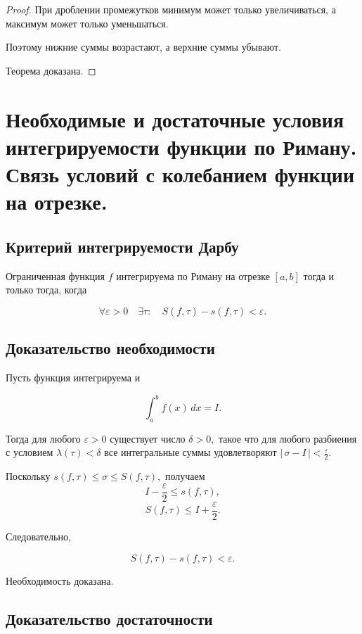 \documentclass[14pt]{extreport}
\begin{document}
\begin{proof}

При дроблении промежутков минимум может только увеличиваться,
а максимум может только уменьшаться.

Поэтому нижние суммы возрастают,
а верхние суммы убывают.

Теорема доказана.
\end{proof}

    \chapter{Необходимые и достаточные условия интегрируемости функции по Риману. Связь условий с колебанием функции на отрезке.}
    \section{Критерий интегрируемости Дарбу}

\begin{theorem}
Ограниченная функция $f$ интегрируема по Риману на отрезке $[a,b]$
тогда и только тогда, когда

\[
\boxed{
\forall\varepsilon>0
\quad
\exists\tau:
\quad
S(f,\tau)-s(f,\tau)<\varepsilon.
}
\]

\end{theorem}

\section{Доказательство необходимости}

Пусть функция интегрируема и

\[
\int_a^b f(x)\,dx=I.
\]

Тогда для любого
$\varepsilon>0$
существует число
$\delta>0,$
такое что для любого разбиения с условием
$\lambda(\tau)<\delta$
все интегральные суммы удовлетворяют $|\,\sigma-I\,|<\frac{\varepsilon}{2}.$

Поскольку $s(f,\tau)
\le
\sigma
\le
S(f,\tau),
$
получаем
$$I-\frac{\varepsilon}{2}
\le
s(f,\tau),
$$
\[
S(f,\tau)
\le
I+\frac{\varepsilon}{2}.
\]

Следовательно,

\[
S(f,\tau)-s(f,\tau)
<
\varepsilon.
\]

Необходимость доказана.

\section{Доказательство достаточности}
\end{document}
